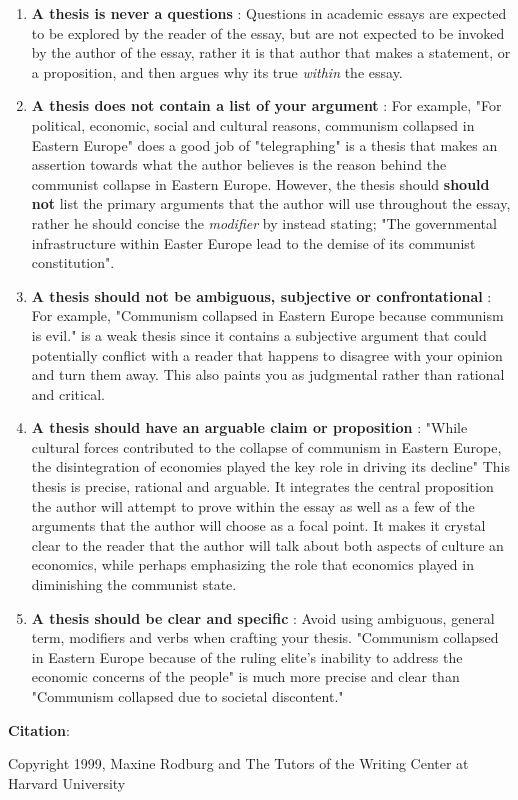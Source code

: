 \documentclass[12pt]{article} %
\begin{document}
\begin{enumerate}
  \item \textbf{A thesis is never a questions} : Questions in academic essays are expected to be explored by the reader of the essay, but are not
    expected to be invoked by the author of the essay, rather it is that author that makes a statement, or a proposition, and then argues why its true
    \textit{within} the essay.  

  \item \textbf{A thesis does not contain a list of your argument} : For example, "For political, economic, social and cultural reasons, 
    communism collapsed in Eastern Europe" does a good job of "telegraphing" is a thesis that makes an assertion towards what the author believes is the reason behind
    the communist collapse in Eastern Europe. However, the thesis should \textbf{should not} list the primary arguments that the author will use throughout the essay, rather
    he should concise the \textit{modifier} by instead stating; "The governmental infrastructure within Easter Europe lead to the demise of its communist constitution". 

  \item \textbf{A thesis should not be ambiguous, subjective or confrontational} : For example, "Communism collapsed in Eastern Europe because communism is evil."
    is a weak thesis since it contains a subjective argument that could potentially conflict with a reader that happens to disagree with your opinion and turn them
    away. This also paints you as judgmental rather than rational and critical. 

  \item \textbf{A thesis should have an arguable claim or proposition} : "While cultural forces contributed to the collapse of communism in Eastern Europe, 
    the disintegration of economies played the key role in driving its decline" This thesis is precise, rational and arguable. It integrates the central proposition the author
    will attempt to prove within the essay as well as a few of the arguments that the author will choose as a focal point. It makes it crystal clear to the reader that the author
    will talk about both aspects of culture an economics, while perhaps emphasizing the role that economics played in diminishing the communist state. 

  \item \textbf{A thesis should be clear and specific} : Avoid using ambiguous, general term, modifiers and verbs when crafting your thesis. 
    "Communism collapsed in Eastern Europe because of the ruling elite's inability to address the economic concerns of the people" is much more precise and clear than 
    "Communism collapsed due to societal discontent."

\end{enumerate}

\textbf{Citation}: 

Copyright 1999, Maxine Rodburg and The Tutors of the Writing Center at Harvard University

  
\end{document}
